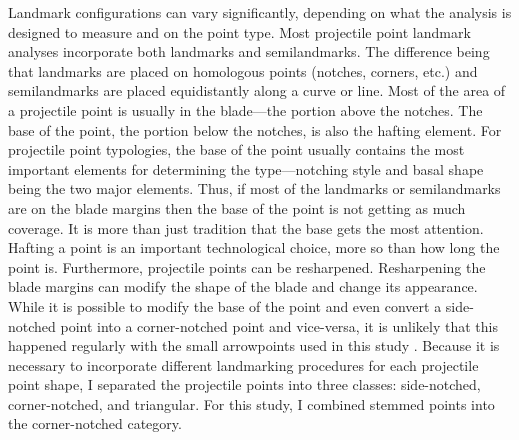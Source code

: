 \documentclass[PCJ,Unicode,screen,mode=plain]{cedram}
\begin{document}
Landmark configurations can vary significantly, depending on what the analysis is designed to measure and on the point type. Most projectile point landmark analyses incorporate both landmarks and semilandmarks. The difference being that landmarks are placed on homologous points (notches, corners, etc.) and semilandmarks are placed equidistantly along a curve or line. Most of the area of a projectile point is usually in the blade---the portion above the notches. The base of the point, the portion below the notches, is also the hafting element. For projectile point typologies, the base of the point usually contains the most important elements for determining the type---notching style and basal shape being the two major elements. Thus, if most of the landmarks or semilandmarks are on the blade margins then the base of the point is not getting as much coverage. It is more than just tradition that the base gets the most attention. Hafting a point is an important technological choice, more so than how long the point is. Furthermore, projectile points can be resharpened. Resharpening the blade margins can modify the shape of the blade and change its appearance. While it is possible to modify the base of the point and even convert a side-notched point into a corner-notched point and vice-versa, it is unlikely that this happened regularly with the small arrowpoints used in this study \autocite{Loendorf2019-df}. Because it is necessary to incorporate different landmarking procedures for each projectile point shape, I separated the projectile points into three classes: side-notched, corner-notched, and triangular. For this study, I combined stemmed points into the corner-notched category.
\end{document}

